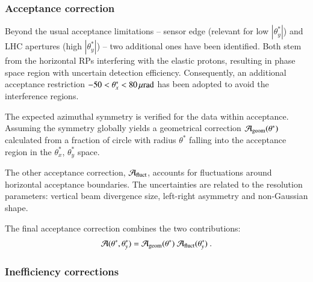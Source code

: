 


\subsubsection{Acceptance correction}

Beyond the usual acceptance limitations -- sensor edge (relevant for low $|\theta^*_y|$) and LHC apertures (high $|\theta_y^*|$) -- two additional ones have been identified. Both stem from the horizontal RPs interfering with the elastic protons, resulting in phase space region with uncertain detection efficiency. Consequently, an additional acceptance restriction $-50 < \theta_x^* < 80\,{\rm \mu rad}$ has been adopted to avoid the interference regions. 

The expected azimuthal symmetry is verified for the data within acceptance. Assuming the symmetry globally yields a geometrical correction ${\cal A}_{\rm geom}(\theta^*)$ calculated from a fraction of circle with radius $\theta^*$ falling into the acceptance region in the $\theta_x^*$, $\theta_y^*$ space.

The other acceptance correction, ${\cal A}_{\rm fluct}$, accounts for fluctuations around horizontal acceptance boundaries.  The uncertainties are related to the resolution parameters: vertical beam divergence size, left-right asymmetry and non-Gaussian shape.

The final acceptance correction combines the two contributions:
\begin{equation}
{\cal A}(\theta^*, \theta_y^*) = {\cal A}_{\rm geom}(\theta^*)\ {\cal A}_{\rm fluct}(\theta_y^*)\ .
\end{equation}

\subsubsection{Inefficiency corrections}

